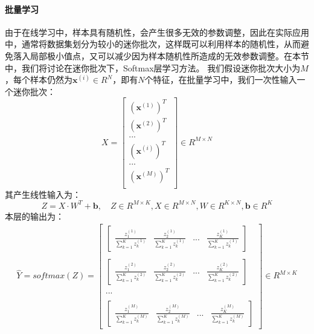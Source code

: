 \documentclass[UTF8]{article}
\begin{document}
\paragraph{批量学习}
由于在线学习中，样本具有随机性，会产生很多无效的参数调整，因此在实际应用中，通常将数据集划分为较小的迷你批次，这样既可以利用样本的随机性，从而避免落入局部极小值点，又可以减少因为样本随机性所造成的无效参数调整。在本节中，我们将讨论在迷你批次下，Softmax层学习方法。\newline
我们假设迷你批次大小为$M$，每个样本仍然为$\boldsymbol{x}^{(i)} \in R^{N}$，即有$N$个特征，在批量学习中，我们一次性输入一个迷你批次：
\begin{equation}
X=\begin{bmatrix}
(\boldsymbol{x}^{(1)})^{T} \\
(\boldsymbol{x}^{(2)})^{T} \\
... \\

(\boldsymbol{x}^{(i)})^{T} \\
... \\

(\boldsymbol{x}^{(M)})^{T} \\
\end{bmatrix} \in R^{M \times N}
\label{mlp-mini-batch-X-def}
\end{equation}
其产生线性输入为：
\begin{equation}
Z=X \cdot W^{T}+ \boldsymbol{b}, \quad Z \in R^{M \times K},X\in R^{M \times N}, W \in R^{K \times N} , \boldsymbol{b} \in R^{K}
\label{mlp-Z-XWT}
\end{equation}
本层的输出为：
\begin{equation}
\begin{aligned}
\hat{Y}=softmax(Z)=\begin{bmatrix}
\begin{bmatrix}
\frac{z_{1}^{(1)}}{\sum_{k=1}^{K}z_{k}^{(1)}} & \frac{z_{2}^{(1)}}{\sum_{k=1}^{K}z_{k}^{(1)}} & ... & \frac{z_{K}^{(1)}}{\sum_{k=1}^{K}z_{k}^{(1)}}
 \end{bmatrix} \\ \\
\begin{bmatrix}
\frac{z_{1}^{(2)}}{\sum_{k=1}^{K}z_{k}^{(2)}} & \frac{z_{2}^{(2)}}{\sum_{k=1}^{K}z_{k}^{(2)}} & ... & \frac{z_{K}^{(2)}}{\sum_{k=1}^{K}z_{k}^{(2)}}
 \end{bmatrix} \\ \\
 ... \\ \\
 \begin{bmatrix}
\frac{z_{1}^{(M)}}{\sum_{k=1}^{K}z_{k}^{(M)}} & \frac{z_{2}^{(M)}}{\sum_{k=1}^{K}z_{k}^{(M)}} & ... & \frac{z_{K}^{(M)}}{\sum_{k=1}^{K}z_{k}^{(M)}}
 \end{bmatrix}
\end{bmatrix} \in R^{M \times K}
\end{aligned}
\label{mlp-Y-hat-def}
\end{equation}
\end{document}

